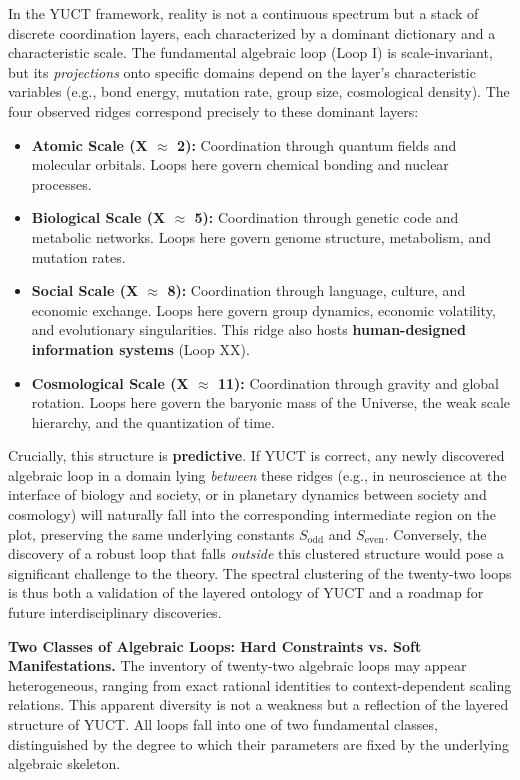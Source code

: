 \documentclass[12pt,a4paper]{article}
\begin{document}
	In the YUCT framework, reality is not a continuous spectrum but a stack of discrete coordination layers, each characterized by a dominant dictionary and a characteristic scale. The fundamental algebraic loop (Loop I) is scale-invariant, but its \textit{projections} onto specific domains depend on the layer's characteristic variables (e.g., bond energy, mutation rate, group size, cosmological density). The four observed ridges correspond precisely to these dominant layers:
	\begin{itemize}
		\item \textbf{Atomic Scale (X $\approx$ 2):} Coordination through quantum fields and molecular orbitals. Loops here govern chemical bonding and nuclear processes.
		\item \textbf{Biological Scale (X $\approx$ 5):} Coordination through genetic code and metabolic networks. Loops here govern genome structure, metabolism, and mutation rates.
		\item \textbf{Social Scale (X $\approx$ 8):} Coordination through language, culture, and economic exchange. Loops here govern group dynamics, economic volatility, and evolutionary singularities. This ridge also hosts \textbf{human-designed information systems} (Loop XX).
		\item \textbf{Cosmological Scale (X $\approx$ 11):} Coordination through gravity and global rotation. Loops here govern the baryonic mass of the Universe, the weak scale hierarchy, and the quantization of time.
	\end{itemize}
	
	Crucially, this structure is \textbf{predictive}. If YUCT is correct, any newly discovered algebraic loop in a domain lying \textit{between} these ridges (e.g., in neuroscience at the interface of biology and society, or in planetary dynamics between society and cosmology) will naturally fall into the corresponding intermediate region on the plot, preserving the same underlying constants \(S_{\mathrm{odd}}\) and \(S_{\mathrm{even}}\). Conversely, the discovery of a robust loop that falls \textit{outside} this clustered structure would pose a significant challenge to the theory. The spectral clustering of the twenty-two loops is thus both a validation of the layered ontology of YUCT and a roadmap for future interdisciplinary discoveries.
	
	\vspace{0.5cm}
	\noindent
	\textbf{Two Classes of Algebraic Loops: Hard Constraints vs. Soft Manifestations.}
	The inventory of twenty-two algebraic loops may appear heterogeneous, ranging from exact rational identities to context-dependent scaling relations. This apparent diversity is not a weakness but a reflection of the layered structure of YUCT. All loops fall into one of two fundamental classes, distinguished by the degree to which their parameters are fixed by the underlying algebraic skeleton.
	
\end{document}
